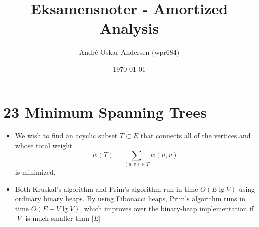 \documentclass{report}
\title{Eksamensnoter - Amortized Analysis}
\author{André Oskar Andersen (wpr684)}
\date{\today}
\begin{document}
\maketitle

\section*{23 Minimum Spanning Trees}
\begin{itemize}
    \item We wish to find an acyclic subset $T \subset E$ that connects all of the vertices and whose total weight
    $$w(T) = \sum_{(u, v) \in T} w(u, v)$$
    is minimized.
    \item Both Kruskal's algorithm and Prim's algorithm run in time $O(E \lg V)$ using ordinary binary heaps. By using Fibonacci heaps, Prim's algorithm runs in time $O(E + V \lg V)$, which improves over the binary-heap implementation if $|V|$ is much smaller than $|E|$
\end{itemize}
\end{document}

